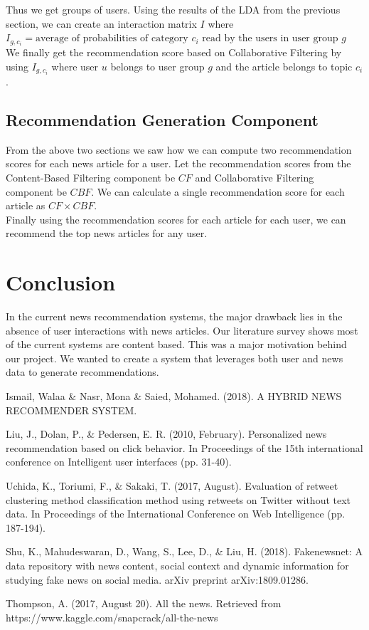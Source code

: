 \documentclass{article}
\begin{document}
Thus we get groups of users. Using the results of the LDA from the previous section, we can create an interaction matrix $I$ where $I_{g, c_i} = \textrm{average of probabilities of category $c_i$ read by the users in user group $g$}$ \\

We finally get the recommendation score based on Collaborative Filtering by using $I_{g, c_i}$ where user $u$ belongs to user group $g$ and the article belongs to topic $c_i$.
\subsection{Recommendation Generation Component}

From the above two sections we saw how we can compute two recommendation scores for each news article for a user. Let the recommendation scores from the Content-Based Filtering component be $CF$ and Collaborative Filtering component be $CBF$. We can calculate a single recommendation score for each article as $CF \times CBF$. \\

Finally using the recommendation scores for each article for each user, we can recommend the top news articles for any user. \\


\section{Conclusion}

In the current news recommendation systems, the major drawback lies in the absence of user interactions with news articles. Our literature survey shows most of the current systems are content based. This was a major motivation behind our project. We wanted to create a system that leverages both user and news data to generate recommendations. 

\begin{thebibliography}{9}

 Ismail, Walaa \& Nasr, Mona \& Saied, Mohamed. (2018). A HYBRID NEWS RECOMMENDER SYSTEM.

 Liu, J., Dolan, P., \& Pedersen, E. R. (2010, February). Personalized news recommendation based on click behavior. In Proceedings of the 15th international conference on Intelligent user interfaces (pp. 31-40).

 Uchida, K., Toriumi, F., \& Sakaki, T. (2017, August). Evaluation of retweet clustering method classification method using retweets on Twitter without text data. In Proceedings of the International Conference on Web Intelligence (pp. 187-194).

 Shu, K., Mahudeswaran, D., Wang, S., Lee, D., \& Liu, H. (2018). Fakenewsnet: A data repository with news content, social context and dynamic information for studying fake news on social media. arXiv preprint arXiv:1809.01286.

 Thompson, A. (2017, August 20). All the news. Retrieved from https://www.kaggle.com/snapcrack/all-the-news

\end{thebibliography}
\end{document}
